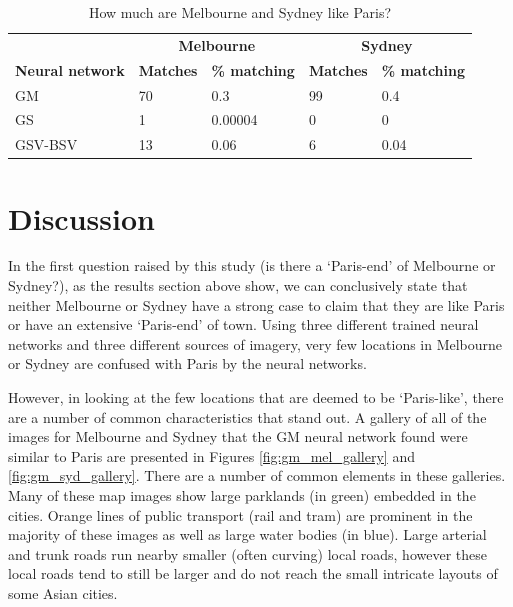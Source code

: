 \documentclass[sageh,times]{sagej}
\begin{document}
\begin{table}[!htbp]
\caption{How much are Melbourne and Sydney like Paris? \label{tab:melbournesydneyparis}}     
\begin{tabular}{ l  l l l  l}
 \hline    &  \multicolumn{2}{c}{\textbf{Melbourne}} & \multicolumn{2}{c}{\textbf{Sydney}}  \\  
\textbf{Neural network} & \textbf{Matches} & \textbf{\% matching}  & \textbf{Matches} & \textbf{\% matching}\\ \hline
GM & 70 & 0.3 & 99 & 0.4 \\ 
GS & 1 & 0.00004 & 0 & 0 \\ 
GSV-BSV & 13 & 0.06 & 6 & 0.04 \\ \hline

\end{tabular}
\end{table}









\section{Discussion}\label{sec:discussion}


In the first question raised by this study (is there a `Paris-end' of Melbourne or Sydney?), as the results section above show, we can conclusively state that neither Melbourne or Sydney have a strong case to claim that they are like Paris or have an extensive `Paris-end' of town. Using three different trained neural networks and three different sources of imagery, very few locations in Melbourne or Sydney are confused with Paris by the neural networks. 

However, in looking at the few locations that are deemed to be `Paris-like', there are a number of common characteristics that stand out. A gallery of all of the images for Melbourne and Sydney that the GM neural network found were similar to Paris are presented in Figures \ref{fig:gm_mel_gallery} and \ref{fig:gm_syd_gallery}. There are a number of common elements in these galleries. Many of these map images show large parklands (in green) embedded in the cities. Orange lines of public transport (rail and tram) are prominent in the majority of these images as well as large water bodies (in blue). Large arterial and trunk roads run nearby smaller (often curving) local roads, however these local roads tend to still be larger and do not reach the small intricate layouts of some Asian cities.
\end{document}
